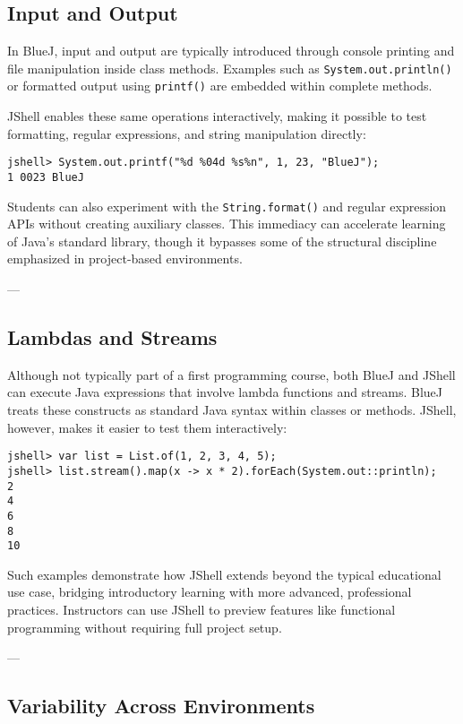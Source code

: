\documentclass{article}
\begin{document}
\subsection{Input and Output}

In BlueJ, input and output are typically introduced through console printing and file manipulation inside class methods. Examples such as \texttt{System.out.println()} or formatted output using \texttt{printf()} are embedded within complete methods. 

JShell enables these same operations interactively, making it possible to test formatting, regular expressions, and string manipulation directly:

\begin{lstlisting}
jshell> System.out.printf("%d %04d %s%n", 1, 23, "BlueJ");
1 0023 BlueJ
\end{lstlisting}

Students can also experiment with the \texttt{String.format()} and regular expression APIs without creating auxiliary classes. This immediacy can accelerate learning of Java’s standard library, though it bypasses some of the structural discipline emphasized in project-based environments.

---

\subsection{Lambdas and Streams}

Although not typically part of a first programming course, both BlueJ and JShell can execute Java expressions that involve lambda functions and streams. BlueJ treats these constructs as standard Java syntax within classes or methods. JShell, however, makes it easier to test them interactively:

\begin{lstlisting}
jshell> var list = List.of(1, 2, 3, 4, 5);
jshell> list.stream().map(x -> x * 2).forEach(System.out::println);
2
4
6
8
10
\end{lstlisting}

Such examples demonstrate how JShell extends beyond the typical educational use case, bridging introductory learning with more advanced, professional practices. Instructors can use JShell to preview features like functional programming without requiring full project setup.

---

\subsection{Variability Across Environments}
\end{document}
